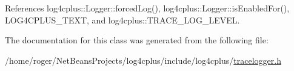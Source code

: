 References log4cplus\-::\-Logger\-::forced\-Log(), log4cplus\-::\-Logger\-::is\-Enabled\-For(), L\-O\-G4\-C\-P\-L\-U\-S\-\_\-\-T\-E\-X\-T, and log4cplus\-::\-T\-R\-A\-C\-E\-\_\-\-L\-O\-G\-\_\-\-L\-E\-V\-E\-L.



The documentation for this class was generated from the following file\-:\begin{DoxyCompactItemize}
\item 
/home/roger/\-Net\-Beans\-Projects/log4cplus/include/log4cplus/\hyperlink{tracelogger_8h}{tracelogger.\-h}\end{DoxyCompactItemize}
